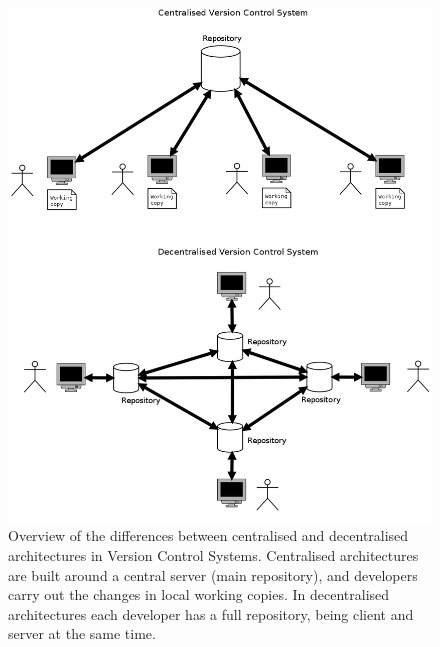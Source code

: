 \begin{figure}[H]
	\centering
	\includegraphics[scale=0.3]{diagrams/svn_vs_git.png}
	\caption[Centralised and decentralised architectures in VCSs]%
	{Overview of the differences between centralised and decentralised architectures in Version Control Systems. Centralised architectures are built around a central server (main repository), and developers carry out the changes in local working copies. In decentralised architectures each developer has a full repository, being client and server at the same time.} \label{cvs-vs-dvcs}
\end{figure}

